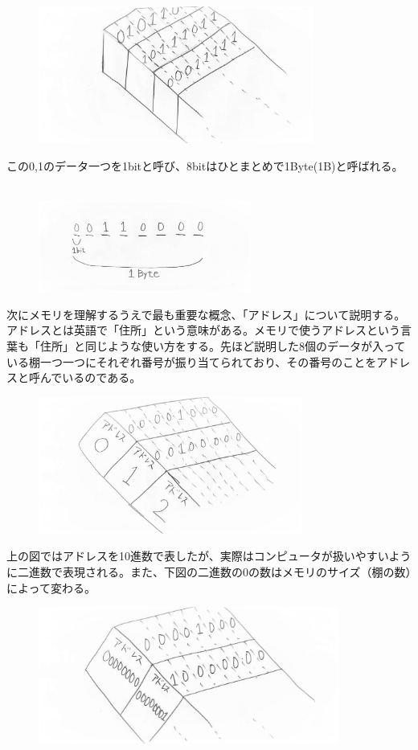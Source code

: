 \begin{figure}[H]
  \centering
  \includegraphics[height=4.5cm]{honda/image/2.jpg}
\end{figure}
この0,1のデータ一つを1bitと呼び、8bitはひとまとめで1Byte(1B)と呼ばれる。\\　
\begin{figure}[H]
  \centering
  \includegraphics[height=3cm]{honda/image/3.jpeg}
\end{figure}
次にメモリを理解するうえで最も重要な概念、「アドレス」について説明する。アドレスとは英語で「住所」という意味がある。メモリで使うアドレスという言葉も「住所」と同じような使い方をする。先ほど説明した8個のデータが入っている棚一つ一つにそれぞれ番号が振り当てられており、その番号のことをアドレスと呼んでいるのである。
\begin{figure}[H]
  \centering
  \includegraphics[height=4.5cm]{honda/image/4.jpg}
\end{figure}
上の図ではアドレスを10進数で表したが、実際はコンピュータが扱いやすいように二進数で表現される。また、下図の二進数の0の数はメモリのサイズ（棚の数）によって変わる。
\begin{figure}[H]
  \centering
  \includegraphics[height=4.5cm]{honda/image/5.jpg}
\end{figure}
